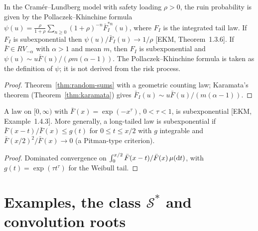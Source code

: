 \begin{theorem}
  \label{thm:ruin}
  \leanok
  In the Cramér--Lundberg model with safety loading $\rho > 0$, the ruin probability is given by
  the Pollaczek--Khinchine formula
  $\psi(u) = \frac{\rho}{1+\rho} \sum_{n \ge 0} (1+\rho)^{-n} \bar F_I^{*n}(u)$, where $F_I$ is the
  integrated tail law. If $F_I$ is subexponential then $\psi(u) / \bar F_I(u) \to 1/\rho$
  [EKM, Theorem~1.3.6]. If $\bar F \in RV_{-\alpha}$ with $\alpha > 1$ and mean $m$, then $F_I$ is
  subexponential and $\psi(u) \sim u \bar F(u) / (\rho m (\alpha - 1))$. The Pollaczek--Khinchine
  formula is taken as the definition of $\psi$; it is not derived from the risk process.
\end{theorem}
\begin{proof}
  \leanok
  Theorem~\ref{thm:random-sums} with a geometric counting law; Karamata's theorem
  (Theorem~\ref{thm:karamata}) gives $\bar F_I(u) \sim u \bar F(u)/(m(\alpha-1))$.
\end{proof}

\begin{theorem}
  \label{thm:weibull-subexp}
  \leanok
  A law on $[0,\infty)$ with $\bar F(x) = \exp(-x^\tau)$, $0 < \tau < 1$, is subexponential
  [EKM, Example~1.4.3]. More generally, a long-tailed law is subexponential if
  $\bar F(x-t)/\bar F(x) \le g(t)$ for $0 \le t \le x/2$ with $g$ integrable and
  $\bar F(x/2)^2 / \bar F(x) \to 0$ (a Pitman-type criterion).
\end{theorem}
\begin{proof}
  \leanok
  Dominated convergence on $\int_0^{x/2} \bar F(x-t)/\bar F(x) \, \mu(\mathrm{d} t)$, with
  $g(t) = \exp(\tau t^\tau)$ for the Weibull tail.
\end{proof}

\section{\texorpdfstring{Examples, the class $\mathcal S^*$ and convolution roots}{Examples, the class S* and convolution roots}}

